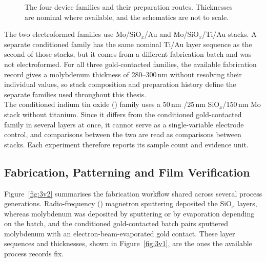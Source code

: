 \begin{figure}[htbp!]
\caption[Device families and preparation routes.]{The four device families and
their preparation routes. Thicknesses are nominal where available, and the
schematics are not to scale.}
\label{fig:3v1}
\label{fig:3stack}
\end{figure}

\noindent The two electroformed families use Mo/SiO$_x$/Au and Mo/SiO$_x$/Ti/Au stacks. A separate conditioned
family has the same nominal Ti/Au layer sequence as the second of those stacks, but it comes from a different
fabrication batch and was not electroformed. For all three gold-contacted families, the available fabrication
record gives a molybdenum thickness of 280--300\,nm without resolving their individual values, so stack
composition and preparation history define the separate families used throughout this thesis.\\

\noindent The conditioned indium tin oxide () family uses a 50\,nm /25\,nm SiO$_x$/150\,nm Mo stack without
titanium. Since it differs from the conditioned gold-contacted family in several layers at once, it cannot serve as
a single-variable electrode control, and comparisons between the two are read as comparisons between stacks. Each
experiment therefore reports its sample count and evidence unit.

\subsection[Fabrication, Patterning and Film Verification]{Fabrication, Patterning and Film Verification}

\noindent Figure~\ref{fig:3v2} summarises the fabrication workflow shared across several process generations.
Radio-frequency () magnetron sputtering deposited the SiO$_x$ layers, whereas molybdenum was
deposited by sputtering or by evaporation depending on the batch, and the conditioned gold-contacted batch pairs
sputtered molybdenum with an electron-beam-evaporated gold contact. These layer sequences and thicknesses, shown in
Figure~\ref{fig:3v1}, are the ones the available process records fix.\\

